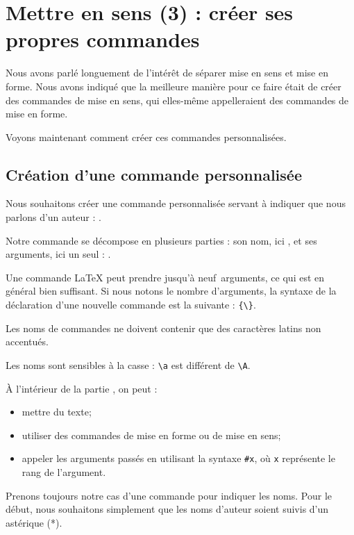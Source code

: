\chapter{Mettre en sens (3) : créer ses propres commandes}\label{creercommandes}

\begin{intro}
Nous avons parlé longuement de l'intérêt de séparer mise en sens et mise en forme.
Nous avons indiqué que la meilleure manière pour ce faire était de créer des commandes de mise en sens, qui elles-même appelleraient des commandes de mise en forme.

Voyons maintenant comment créer ces commandes personnalisées.
\end{intro}

\section{Création d'une commande personnalisée}

Nous souhaitons créer une commande personnalisée servant à indiquer que nous parlons d'un auteur : .

Notre commande se décompose en plusieurs parties : son nom, ici , et ses arguments, ici un seul : .

Une commande LaTeX peut prendre jusqu'à neuf~arguments, ce qui est en général bien suffisant. Si nous notons  le nombre d'arguments, la syntaxe de la déclaration d'une nouvelle commande est la suivante :
\verb|{\|\verb|}|.

\begin{attention}
    Les noms de commandes ne doivent contenir que des caractères latins non accentués. 
    
    Les noms sont sensibles à la casse : \verb|\a| est différent de \verb|\A|.
\end{attention}
À l'intérieur de la partie , on peut  :
\begin{itemize}
    \item mettre du texte;
    \item utiliser des commandes de mise en forme ou de mise en sens;
    \item appeler les arguments passés en utilisant la syntaxe \verb|#x|, où \verb|x| représente le rang de l'argument.
\end{itemize}

Prenons toujours notre cas d'une commande pour indiquer les noms. Pour le début, nous souhaitons simplement que les noms d'auteur soient suivis d'un astérique (*).

